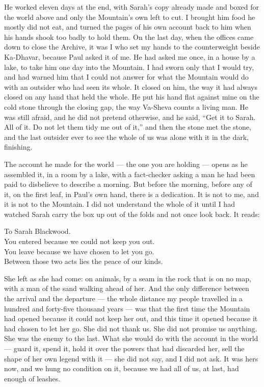 He worked eleven days at the end, with Sarah's copy already made and boxed for the world above and only the Mountain's own left to cut. I brought him food he mostly did not eat, and turned the pages of his own account back to him when his hands shook too badly to hold them. On the last day, when the offices came down to close the Archive, it was I who set my hands to the counterweight beside Ka-Dhavar, because Paul asked it of me. He had asked me once, in a house by a lake, to take him one day into the Mountain. I had sworn only that I would try, and had warned him that I could not answer for what the Mountain would do with an outsider who had seen its whole. It closed on him, the way it had always closed on any hand that held the whole. He put his hand flat against mine on the cold stone through the closing gap, the way Va-Sheva counts a living man. He was still afraid, and he did not pretend otherwise, and he said, ``Get it to Sarah. All of it. Do not let them tidy me out of it,'' and then the stone met the stone, and the last outsider ever to see the whole of us was alone with it in the dark, finishing.\par

\ornament

The account he made for the world --- the one you are holding --- opens as he assembled it, in a room by a lake, with a fact-checker asking a man he had been paid to disbelieve to describe a morning. But before the morning, before any of it, on the first leaf, in Paul's own hand, there is a dedication. It is not to me, and it is not to the Mountain. I did not understand the whole of it until I had watched Sarah carry the box up out of the folds and not once look back. It reads:\par

\begin{scripture}
To Sarah Blackwood.\\
You entered because we could not keep you out.\\
You leave because we have chosen to let you go.\\
Between those two acts lies the peace of our kinds.
\end{scripture}

She left as she had come: on animals, by a seam in the rock that is on no map, with a man of the sand walking ahead of her. And the only difference between the arrival and the departure --- the whole distance my people travelled in a hundred and forty-five thousand years --- was that the first time the Mountain had opened because it could not keep her out, and this time it opened because it had chosen to let her go. She did not thank us. She did not promise us anything. She was the enemy to the last. What she would do with the account in the world --- guard it, spend it, hold it over the powers that had discarded her, sell the shape of her own legend with it --- she did not say, and I did not ask. It was hers now, and we hung no condition on it, because we had all of us, at last, had enough of leashes.\par

